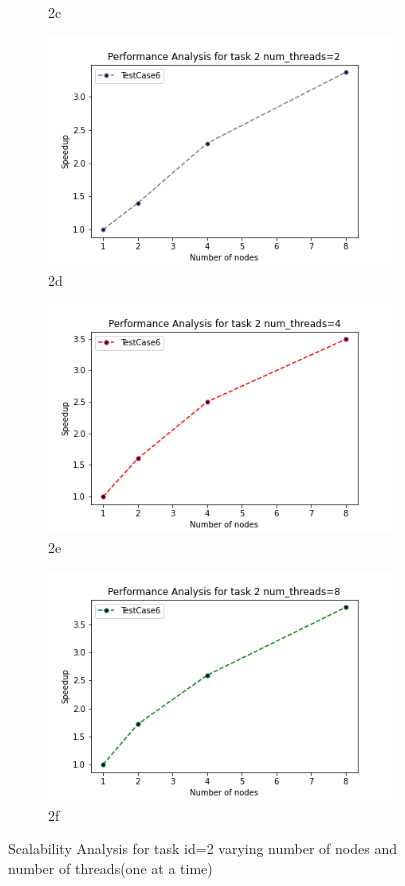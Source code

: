 \documentclass{article}
\begin{document}
\begin{figure}[H]
\begin{subfigure}{.5\textwidth}
  \caption{2c}
  \label{fig:sfig1}
\end{subfigure}%
\begin{subfigure}{.5\textwidth}
  \centering
  \includegraphics[width=.8\linewidth]{Assignment2/report/2threads=2.png}
  \caption{2d}
  \label{fig:sfig2}
\end{subfigure}
\begin{subfigure}{.5\textwidth}
  \centering
  \includegraphics[width=.8\linewidth]{Assignment2/report/2threads=4.png}
  \caption{2e}
  \label{fig:sfig1}
\end{subfigure}%
\begin{subfigure}{.5\textwidth}
  \centering
  \includegraphics[width=.8\linewidth]{Assignment2/report/2threads=8.png}
  \caption{2f}
  \label{fig:sfig2}
\end{subfigure}

\caption{Scalability Analysis for task id=2 varying number of nodes and number of threads(one at a time)}
\label{fig:fig}
\end{figure}
\end{document}
